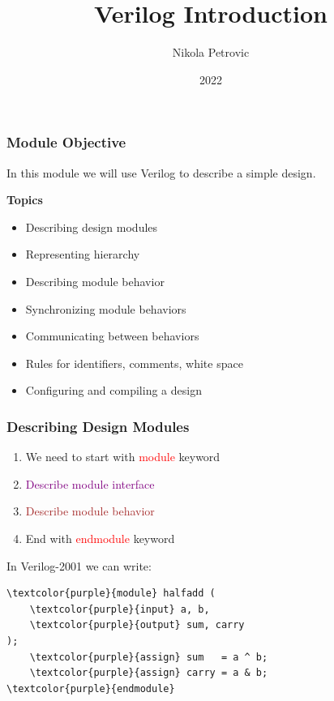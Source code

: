 \documentclass[t, notes]{beamer}
\title{Verilog Introduction}
\author{Nikola Petrovic}
\institute{University of Belgrade, School of Electrical Engineering}
\date{2022}
\begin{document}
\frame{\titlepage}

\begin{frame}
\frametitle{Module Objective}

In this module we will use Verilog to describe a simple design.
\newline

\textbf{Topics}

\begin{itemize}
\item Describing design modules
\item Representing hierarchy
\item Describing module behavior
\item Synchronizing module behaviors
\item Communicating between behaviors
\item Rules for identifiers, comments, white space
\item Configuring and compiling a design
\end{itemize}

\end{frame}

\begin{frame}[fragile]
\frametitle{Describing Design Modules}

\begin{enumerate}
\item We need to start with \textcolor{red}{module} keyword
\item \textcolor{purple}{Describe module interface}
\item \textcolor{brown}{Describe module behavior}
\item End with \textcolor{red}{endmodule} keyword
\end{enumerate}

In Verilog-2001 we can write:
\newline

\begin{Verbatim}[commandchars=\\\{\}, tabsize=2]
\textcolor{purple}{module} halfadd (
	\textcolor{purple}{input} a, b,
	\textcolor{purple}{output} sum, carry
);
	\textcolor{purple}{assign} sum   = a ^ b;
	\textcolor{purple}{assign} carry = a & b;
\textcolor{purple}{endmodule}
\end{Verbatim}

\end{frame}
\end{document}
